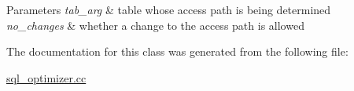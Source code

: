 \begin{DoxyParams}{Parameters}
{\em tab\+\_\+arg} & table whose access path is being determined \\
\hline
{\em no\+\_\+changes} & whether a change to the access path is allowed \\
\hline
\end{DoxyParams}


The documentation for this class was generated from the following file\+:\begin{DoxyCompactItemize}
\item 
\mbox{\hyperlink{sql__optimizer_8cc}{sql\+\_\+optimizer.\+cc}}\end{DoxyCompactItemize}
